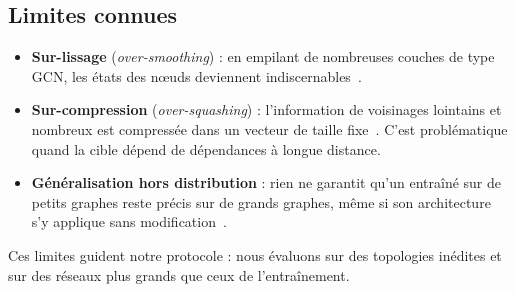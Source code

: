 \subsection{Limites connues}
\begin{itemize}
  \item \textbf{Sur-lissage} (\emph{over-smoothing}) : en empilant de nombreuses couches de type GCN, les états des nœuds deviennent indiscernables~\cite{oversmoothing}.
  \item \textbf{Sur-compression} (\emph{over-squashing}) : l'information de voisinages lointains et nombreux est compressée dans un vecteur de taille fixe~\cite{oversquashing}. C'est problématique quand la cible dépend de dépendances à longue distance.
  \item \textbf{Généralisation hors distribution} : rien ne garantit qu'un \gnn{} entraîné sur de petits graphes reste précis sur de grands graphes, même si son architecture s'y applique sans modification~\cite{datasetshift}.
\end{itemize}
Ces limites guident notre protocole : nous évaluons sur des topologies inédites et sur des réseaux plus grands que ceux de l'entraînement.

